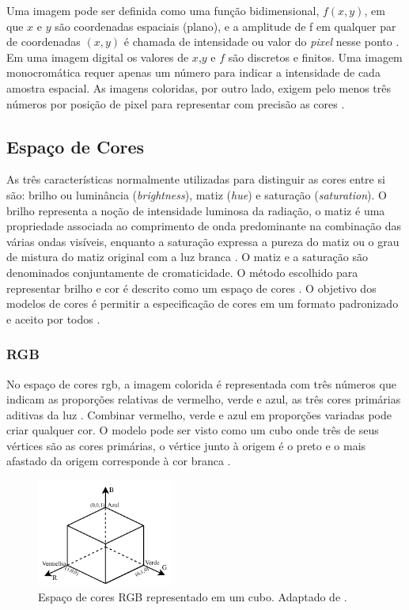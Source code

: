 Uma imagem pode ser definida como uma função bidimensional, $f(x,y)$, em que $x$ e $y$ são coordenadas espaciais (plano), e a amplitude de f em qualquer par de coordenadas $(x, y)$ é chamada de intensidade ou valor do \textit{pixel} nesse ponto \cite{gonzalez2009processamento}. Em uma imagem digital os valores de $x$,$y$ e $f$ são discretos e finitos. 
Uma imagem monocromática requer apenas um número para indicar a intensidade de cada amostra espacial. As imagens coloridas, por outro lado, exigem pelo menos três números por posição de pixel para representar com precisão as cores \cite{richardson2010h}.

\subsection{Espaço de Cores}

As três características normalmente utilizadas para distinguir as cores entre si são: brilho ou luminância (\textit{brightness}), matiz (\textit{hue}) e saturação (\textit{saturation}). O brilho representa a noção de intensidade luminosa da radiação, o matiz é uma propriedade associada ao comprimento de onda predominante na combinação das várias ondas visíveis, enquanto a saturação expressa a pureza do matiz ou o grau de mistura do matiz original com a luz branca \cite{marques1999processamento}. O matiz e a saturação são denominados conjuntamente de cromaticidade.
O método escolhido para representar brilho e cor é descrito como um espaço de cores \cite{richardson2010h}. O objetivo dos modelos de cores é permitir a especificação de cores em um formato padronizado e aceito por todos \cite{gonzalez2009processamento}. 

\subsubsection{RGB}
No espaço de cores \gls{rgb}, a imagem colorida é representada com três números que indicam as proporções relativas de vermelho, verde e azul, as três cores primárias aditivas da luz \cite{richardson2010h}. Combinar vermelho, verde e azul em proporções variadas pode criar qualquer cor. O modelo pode ser visto como um cubo onde três de seus vértices são as cores primárias, o vértice junto à origem é o preto e o mais afastado da origem corresponde à cor branca \cite{gonzalez2009processamento}. 

\begin{figure}[h]
	\centering
	\includegraphics[width=0.4\textwidth]{figuras/rgb.pdf}
	\caption[Espaço tridimensional de cores RGB.]{Espaço de cores RGB representado em um cubo. Adaptado de \cite{gonzalez2009processamento}.}
	\label{fig:rgb}
\end{figure}

